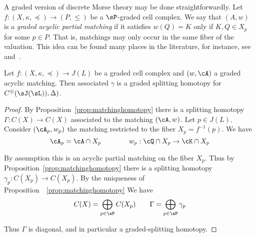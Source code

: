 A graded version of discrete Morse theory may be done straightforwardly.   Let $f:(X,\kappa,\preceq)\to (P,\leq)$ be a $\sP$-graded cell complex.  We say that $(A,w)$ is a {\em graded acyclic partial matching} if it satisfies $w(Q)=K$ only if $K,Q\in X_p$ for some $p\in P$.  That is, matchings may only occur in the same fiber of the valuation.  This idea can be found many places in the literature, for instance, see~\cite{mn} and~\cite[Patchwork Theorem]{koz}.

\begin{prop}
Let $f:(X,\kappa,\preceq)\to J(L)$ be a graded cell complex and $(w,\cA)$ a graded acyclic matching.  Then associated $\gamma$ is a graded splitting homotopy for $C^\oplus(\sJ(\sL)),\Delta)$.  
\end{prop}
\begin{proof}
By Proposition~\ref{prop:matchinghomotopy} there is a splitting homotopy $\Gamma:C(X)\to C(X)$ associated to the matching $(\cA,w)$.  Let $p\in J(L)$.  Consider $(\cA_p,w_p)$ the matching restricted to the fiber $X_p = f^{-1}(p)$.  We have $$\cA_p = \cA\cap X_p\quad\quad \quad \quad  w_p:\cQ\cap X_p\to \cK\cap X_p$$

By assumption this is an acyclic partial matching on the fiber $X_p$.  Thus by Proposition~\ref{prop:matchinghomotopy} there is a splitting homotopy $\gamma_p:C(X_p)\to C(X_p)$.    By the uniqueness of Proposition~~\ref{prop:matchinghomotopy} We have $$C(X) = \bigoplus_{p\in \sP} C(X_p) \quad\quad \Gamma = \bigoplus_{p\in \sP} \gamma_p$$ 

Thus $\Gamma$ is diagonal, and in particular a graded-splitting homotopy.

\end{proof}










